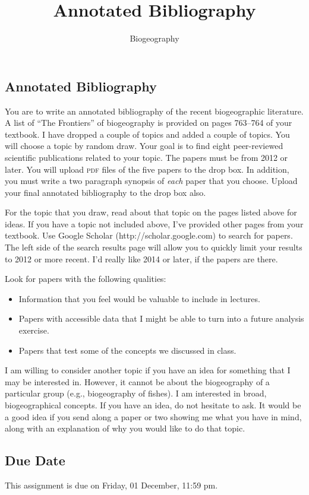 \documentclass[12pt]{article}
\title{Annotated Bibliography}
\author{Biogeography}
\date{}                                           %
\begin{document}
\thispagestyle{plain}



\subsection*{Annotated Bibliography}

You are to write an annotated bibliography of the recent biogeographic literature. A list of ``The Frontiers'' of biogeography is provided on pages 763--764 of your textbook.  I have dropped a couple of topics and added a couple of topics. You will choose a topic by random draw. Your goal is to find eight peer-reviewed scientific publications related to your topic.  The papers must be from 2012 or later.  You will upload \textsc{pdf} files of the five papers to the drop box. In addition, you must write a two paragraph synopsis of \textit{each} paper that you choose. Upload your final annotated bibliography to the drop box also.

For the topic that you draw, read about that topic on the pages listed above for ideas. If you have a topic not included above, I've provided other pages from your textbook. Use Google Scholar (http://scholar.google.com) to search for papers. The left side of the search results page will allow you to quickly limit your results to 2012 or more recent.  I'd really like 2014 or later, if the papers are there.

Look for papers with the following qualities:

\begin{itemize}

\item Information that you feel would be valuable to include in lectures.

\item Papers with accessible data that I might be able to turn into a future analysis exercise.

\item Papers that test some of the concepts we discussed in class.

\end{itemize}

I am willing to consider another topic if you have an idea for something that I may be interested in. However, it cannot be about the biogeography of a particular group (e.g., biogeography of fishes). I am interested in broad, biogeographical concepts.  If you have an idea, do not hesitate to ask. It would be a good idea if you send along a paper or two showing me what you have in mind, along with an explanation of why you would like to do that topic.

\subsection*{Due Date}

This assignment is due on Friday, 01 December, 11:59 pm.
\end{document}
